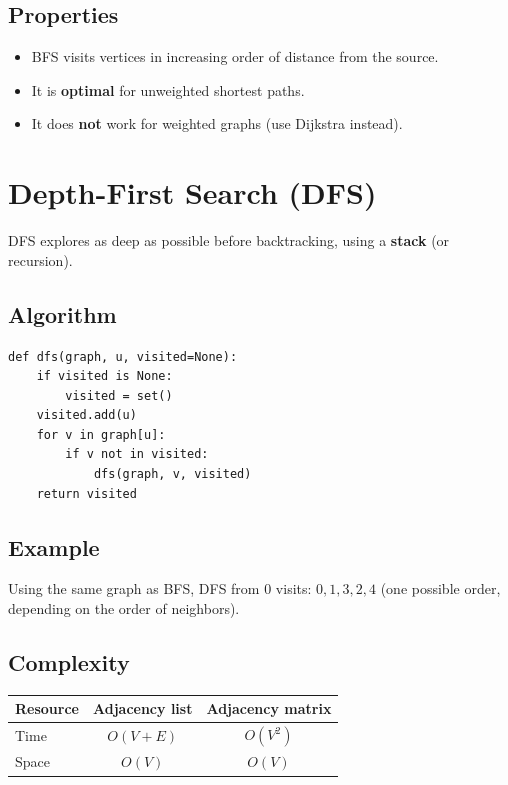 \documentclass[11pt,a4paper]{article}
\begin{document}
\subsection{Properties}

\begin{itemize}
    \item BFS visits vertices in increasing order of distance from the source.
    \item It is \textbf{optimal} for unweighted shortest paths.
    \item It does \textbf{not} work for weighted graphs (use Dijkstra instead).
\end{itemize}

\section{Depth-First Search (DFS)}

DFS explores as deep as possible before backtracking, using a \textbf{stack} (or recursion).

\subsection{Algorithm}

\begin{lstlisting}
def dfs(graph, u, visited=None):
    if visited is None:
        visited = set()
    visited.add(u)
    for v in graph[u]:
        if v not in visited:
            dfs(graph, v, visited)
    return visited
\end{lstlisting}

\subsection{Example}

Using the same graph as BFS, DFS from 0 visits: $0, 1, 3, 2, 4$ (one possible order, depending on the order of neighbors).

\subsection{Complexity}

\begin{center}
\begin{tabular}{lcc}
\toprule
Resource & Adjacency list & Adjacency matrix \\
\midrule
Time & $O(V + E)$ & $O(V^2)$ \\
Space & $O(V)$ & $O(V)$ \\
\bottomrule
\end{tabular}
\end{center}
\end{document}
